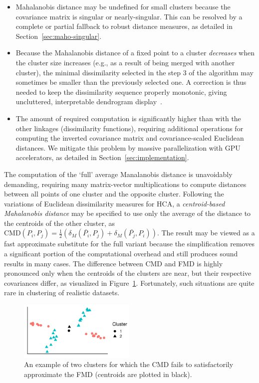 \begin{itemize}
	\item Mahalanobis distance may be undefined for small clusters because the covariance matrix is singular or nearly-singular. This can be resolved by a complete or partial fallback to robust distance measures, as detailed in Section~\ref{sec:maho-singular}.
	\item Because the Mahalanobis distance of a fixed point to a cluster \emph{decreases} when the cluster size increases (e.g., as a result of being merged with another cluster), the minimal dissimilarity selected in the step 3 of the algorithm may sometimes be smaller than the previously selected one.
  A correction is thus needed to keep the dissimilarity sequence properly monotonic, giving uncluttered, interpretable dendrogram display~\cite{everitt2002cambridge}.
	\item The amount of required computation is significantly higher than with the other linkages (dissimilarity functions), requiring additional operations for computing the inverted covariance matrix and covariance-scaled Euclidean distances.
  We mitigate this problem by massive parallelization with GPU accelerators, as detailed in Section~\ref{sec:implementation}.
\end{itemize}

The computation of the `full' average Manalanobis distance is unavoidably demanding, requiring many matrix-vector multiplications to compute distances between all points of one cluster and the opposite cluster.
Following the variations of Euclidean dissimilarity measures for HCA, a \emph{centroid-based Mahalanobis distance} may be specified to use only the average of the distance to the centroids of the other cluster, as $\text{CMD}(P_i, P_j) = \frac{1}{2} \left(\delta_M(\bar{P_i}, P_j) + \delta_M(\bar{P_j}, P_i)\right)$.
The result may be viewed as a fast approximate substitute for the full variant because the simplification removes a significant portion of the computational overhead and still produces sound results in many cases.
The difference between CMD and FMD is highly pronounced only when the centroids of the clusters are near, but their respective covariances differ, as visualized in Figure~\ref{fig:maha_var}.
Fortunately, such situations are quite rare in clustering of realistic datasets.

\begin{figure}[t]
  \centering
	\includegraphics[width=2.2in]{Mahalanobis/img/dists.pdf}
	\caption{An example of two clusters for which the CMD fails to satisfactorily approximate the FMD (centroids are plotted in black).}
	\label{fig:maha_var}
\end{figure}

